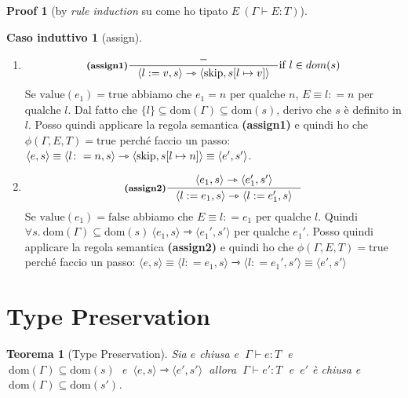 \documentclass[a4paper, 10pt]{article}
\newcommand{\skipp}{\textup{skip}}
\newtheorem{thm}{Teorema}[]
\theoremstyle{definition}
\newtheorem{prf}{Proof}[]
\newtheorem{ind}{Caso induttivo}
\newcommand{\infer}[4]{\inference[\textbf{#1}]{#2}{#3}#4 }
\newcommand{\srule}[2]{\langle #1 \rangle \rightarrowtriangle \langle #2 \rangle}
\newcommand{\memrep}[3]{#1 \lbrack #2 \mapsto #3 \rbrack}
\begin{document}
\begin{multicols}{2}
\begin{prf}[by \textit{rule induction} su come ho tipato $ E\ (\Gamma \vdash E\colon T) $]
\begin{ind}[assign]
		\begin{enumerate}
			\item
			\[
				\infer{(assign1)}{-}{\srule{l:=v,s}{\text{skip}, \memrep{s}{l}{v}}}{\text{if } l \in dom(s)} 
			\]
			Se $ \text{value}(e_1) = \text{true} $ abbiamo che $ e_1 = n $ per qualche $ n $, $ E\equiv l\colon = n $ per qualche $ l $. Dal fatto che $ \{l\} \subseteq \text{dom}(\Gamma)\subseteq \text{dom}(s) $, derivo che $ s $ è definito in $ l $. Posso quindi applicare la regola semantica \textbf{(assign1)} e quindi ho che $ \phi(\Gamma, E, T) =\text{true} $ perché faccio un passo: 
			$ \langle e, s \rangle \equiv \srule{l\colon = n, s}{\skipp, s[l\mapsto n]}\equiv \langle e', s' \rangle $.
			\item
			\[
				\infer{(assign2)}{\srule{e_1,s}{e_1',s'}}{\srule{l:=e_1,s}{l:=e_1',s}}{}
			\]
			Se $ \text{value}(e_1) = \text{false} $ abbiamo che $ E\equiv l\colon = e_1 $ per qualche $ l $. Quindi $ \forall s.\ \text{dom}(\Gamma)\subseteq \text{dom}(s)\ \srule{e_1, s}{e_1', s'} $ per qualche $ e_1' $. Posso quindi applicare la regola semantica \textbf{(assign2)} e quindi ho che $ \phi(\Gamma, E, T) =\text{true} $ perché faccio un passo:
			$ \langle e, s \rangle \equiv \srule{l\colon= e_1, s}{l\colon= e_1', s'} \equiv \langle e', s' \rangle$
		\end{enumerate} 
	\end{ind}
\end{prf}
	
\end{multicols}

\newpage
\setcounter{thm}{0}
\setcounter{prf}{0}
\setcounter{base}{0}
\setcounter{ind}{0}
\section*{Type Preservation}
\begin{thm}[Type Preservation]
	Sia $ e $ chiusa e $\ \Gamma \vdash e\colon T\ $ e $\ \text{dom}(\Gamma) \subseteq \text{dom}(s)\ $ e $\ \srule{e, s}{e', s'} \ $ allora $\ \Gamma \vdash e'\colon T\ $ e $\ e' $ è chiusa e $\ \text{dom}(\Gamma) \subseteq \text{dom}(s') $.
\end{thm}
\end{document}
